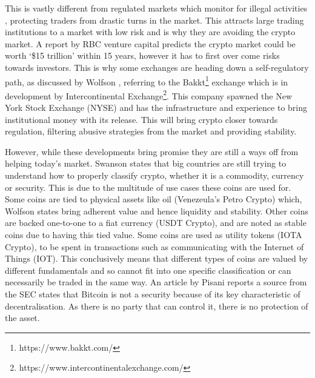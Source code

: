 This is vastly different from regulated markets which monitor for illegal activities \cite{ART:VIGNA:2018}, protecting traders from drastic turns in the market. This attracts large trading institutions to a market with low risk and is why they are avoiding the crypto market. A report by RBC venture capital predicts the crypto market could be worth `\$15 trillion' within 15 years, however it has to first over come risks towards investors. This is why some exchanges are heading down a self-regulatory path, as discussed by Wolfson \cite{ART:WOLFSON:2018}, referring to the Bakkt\footnote{https://www.bakkt.com/} exchange which is in development by Intercontinental Exchange\footnote{https://www.intercontinentalexchange.com/}. This company spawned the New York Stock Exchange (NYSE) and has the infrastructure and experience to bring institutional money with its release. This will bring crypto closer towards regulation, filtering abusive strategies from the market and providing stability.

However, while these developments bring promise they are still a ways off from helping today's market. Swanson \cite{ART:ELLIS:2018} states that big countries are still trying to understand how to properly classify crypto, whether it is a commodity, currency or security. This is due to the multitude of use cases these coins are used for. Some coins are tied to physical assets like oil (Venezeula's Petro Crypto) which, Wolfson \cite{ART:WOLFSON:2018} states bring adherent value and hence liquidity and stability. Other coins are backed one-to-one to a fiat currency (USDT Crypto), and are noted as stable coins due to having this tied value. Some coins are used as utility tokens (IOTA Crypto), to be spent in transactions such as communicating with the Internet of Things (IOT). This conclusively means that different types of coins are valued by different fundamentals and so cannot fit into one specific classification or can necessarily be traded in the same way. An article by Pisani \cite{ART:PISANI:2018} reports a source from the SEC states that Bitcoin is not a security because of its key characteristic of decentralisation. As there is no party that can control it, there is no protection of the asset.

